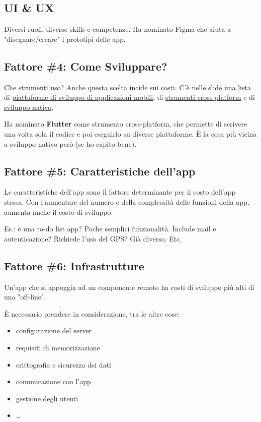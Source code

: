 \subsection{UI \& UX}
\par Diversi ruoli, diverse skills e competenze. Ha nominato Figma che aiuta a "disegnare/creare" i prototipi delle app.

\subsection{Fattore \#4: Come Sviluppare?}
\par Che strumenti uso? Anche questa scelta incide sui costi. C'è nelle slide una lista di \underline{piattaforme di sviluppo di applicazioni mobili}, di \underline{strumenti cross-platform} e di \underline{sviluppo nativo}.
\par Ha nominato \textbf{Flutter} come strumento cross-platform, che permette di scrivere una volta sola il codice e poi eseguirlo su diverse piattaforme. \`E la cosa più vicina a sviluppo nativo però (se ho capito bene).

\subsection{Fattore \#5: Caratteristiche dell'app}
\par Le caratteristiche dell'app sono il fattore determinante per il costo dell'app stessa. Con l'aumentare del numero e della complessità delle funzioni della app, aumenta anche il costo di sviluppo.
\par Es.: è una to-do list app? Poche semplici funzionalità. Include mail e autenticazione? Richiede l'uso del GPS? Già diverso. Etc.

\subsection{Fattore \#6: Infrastrutture}
\par Un'app che si appoggia ad un componente remoto ha costi di sviluppo più alti di una "off-line".
\par \`E necessario prendere in considerazione, tra le altre cose:
\begin{itemize}
    \item configurazione del server
    \item requisiti di memorizzazione 
    \item crittografia e sicurezza dei dati
    \item comunicazione con l'app
    \item gestione degli utenti
    \item \dots
\end{itemize}


